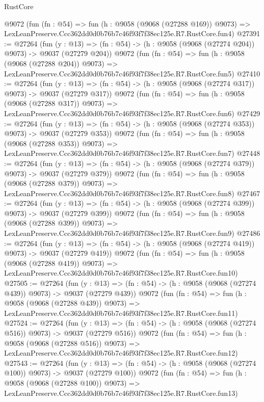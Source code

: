 \begin{lexlean}{RustCore}
\begin{coremodule}
    @9072
    (fun (fn : @54) =>
    fun (h : @9058 (@9068 (@27288 @169)) @9073) =>
    LexLeanPreserve.Ccc362dd0d0b76b7c46f93f7f38ec125e.R7.RustCore.fun4)
@27391 := @27264
    (fun (y : @13) => (fn : @54) -> (h : @9058 (@9068 (@27274 @204)) @9073) -> @9037 (@27279 @204))
    @9072
    (fun (fn : @54) =>
    fun (h : @9058 (@9068 (@27288 @204)) @9073) =>
    LexLeanPreserve.Ccc362dd0d0b76b7c46f93f7f38ec125e.R7.RustCore.fun5)
@27410 := @27264
    (fun (y : @13) => (fn : @54) -> (h : @9058 (@9068 (@27274 @317)) @9073) -> @9037 (@27279 @317))
    @9072
    (fun (fn : @54) =>
    fun (h : @9058 (@9068 (@27288 @317)) @9073) =>
    LexLeanPreserve.Ccc362dd0d0b76b7c46f93f7f38ec125e.R7.RustCore.fun6)
@27429 := @27264
    (fun (y : @13) => (fn : @54) -> (h : @9058 (@9068 (@27274 @353)) @9073) -> @9037 (@27279 @353))
    @9072
    (fun (fn : @54) =>
    fun (h : @9058 (@9068 (@27288 @353)) @9073) =>
    LexLeanPreserve.Ccc362dd0d0b76b7c46f93f7f38ec125e.R7.RustCore.fun7)
@27448 := @27264
    (fun (y : @13) => (fn : @54) -> (h : @9058 (@9068 (@27274 @379)) @9073) -> @9037 (@27279 @379))
    @9072
    (fun (fn : @54) =>
    fun (h : @9058 (@9068 (@27288 @379)) @9073) =>
    LexLeanPreserve.Ccc362dd0d0b76b7c46f93f7f38ec125e.R7.RustCore.fun8)
@27467 := @27264
    (fun (y : @13) => (fn : @54) -> (h : @9058 (@9068 (@27274 @399)) @9073) -> @9037 (@27279 @399))
    @9072
    (fun (fn : @54) =>
    fun (h : @9058 (@9068 (@27288 @399)) @9073) =>
    LexLeanPreserve.Ccc362dd0d0b76b7c46f93f7f38ec125e.R7.RustCore.fun9)
@27486 := @27264
    (fun (y : @13) => (fn : @54) -> (h : @9058 (@9068 (@27274 @419)) @9073) -> @9037 (@27279 @419))
    @9072
    (fun (fn : @54) =>
    fun (h : @9058 (@9068 (@27288 @419)) @9073) =>
    LexLeanPreserve.Ccc362dd0d0b76b7c46f93f7f38ec125e.R7.RustCore.fun10)
@27505 := @27264
    (fun (y : @13) => (fn : @54) -> (h : @9058 (@9068 (@27274 @439)) @9073) -> @9037 (@27279 @439))
    @9072
    (fun (fn : @54) =>
    fun (h : @9058 (@9068 (@27288 @439)) @9073) =>
    LexLeanPreserve.Ccc362dd0d0b76b7c46f93f7f38ec125e.R7.RustCore.fun11)
@27524 := @27264
    (fun (y : @13) => (fn : @54) -> (h : @9058 (@9068 (@27274 @516)) @9073) -> @9037 (@27279 @516))
    @9072
    (fun (fn : @54) =>
    fun (h : @9058 (@9068 (@27288 @516)) @9073) =>
    LexLeanPreserve.Ccc362dd0d0b76b7c46f93f7f38ec125e.R7.RustCore.fun12)
@27543 := @27264
    (fun (y : @13) => (fn : @54) -> (h : @9058 (@9068 (@27274 @100)) @9073) -> @9037 (@27279 @100))
    @9072
    (fun (fn : @54) =>
    fun (h : @9058 (@9068 (@27288 @100)) @9073) =>
    LexLeanPreserve.Ccc362dd0d0b76b7c46f93f7f38ec125e.R7.RustCore.fun13)

\end{coremodule}
\end{lexlean}
